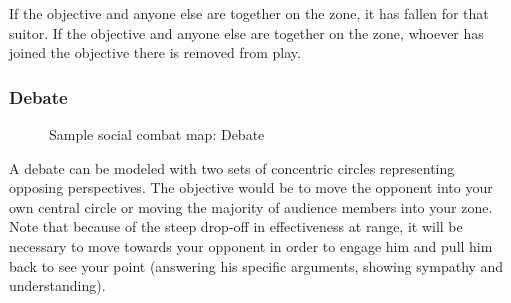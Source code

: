 If the objective and anyone else are together on the \LOVERS{} zone, it has fallen for that suitor. If the objective and anyone else are together on the \JUSTFRIENDS{} zone, whoever has joined the objective there is removed from play.

\subsubsection{Debate}

\begin{figure}
\centering\footnotesize

\caption{Sample social combat map: Debate}
\label{fig:social-combat-map-debate}
\end{figure}

A debate can be modeled with two sets of concentric circles representing opposing perspectives. The objective would be to move the opponent into your own central circle or moving the majority of audience members into your zone. Note that because of the steep drop-off in effectiveness at range, it will be necessary to move towards your opponent in order to engage him and pull him back to see your point (answering his specific arguments, showing sympathy and understanding).

